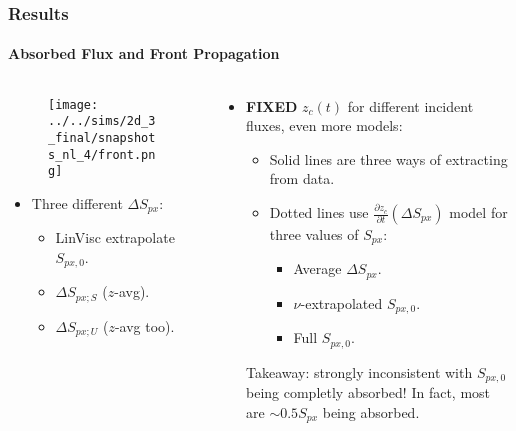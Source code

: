 \documentclass[dvipsnames]{beamer}
\newcommand*{\pd}[2]{\frac{\partial#1}{\partial#2}}
\begin{document}
\begin{frame}
    \frametitle{Results}
    \framesubtitle{Absorbed Flux and Front Propagation}

    \begin{columns}
        \begin{column}{0.5\textwidth}
            \begin{figure}[t]
                \centering
                \texttt{[image: ../../sims/2d\_3\_final/snapshots\_nl\_4/front.png]}
            \end{figure}
            \begin{itemize}
                \item Three different $\Delta S_{px}$:
                    \begin{itemize}
                        \item LinVisc extrapolate $S_{px, 0}$.

                        \item $\Delta S_{px; S}$ ($z$-avg).

                        \item $\Delta S_{px; U}$ ($z$-avg too).
                    \end{itemize}
            \end{itemize}
        \end{column}
        \begin{column}{0.5\textwidth}
            \begin{itemize}

                \item \textbf{FIXED} $z_c(t)$ for different incident fluxes,
                    even more models:
                    \begin{itemize}
                        \item Solid lines are three ways of extracting from
                            data.

                        \item Dotted lines use $\pd{z_c}{t}(\Delta S_{px})$
                            model for three values of $S_{px}$:
                            \begin{itemize}
                                \item Average $\Delta S_{px}$.
                                \item $\nu$-extrapolated $S_{px, 0}$.
                                \item Full $S_{px, 0}$.
                            \end{itemize}
                    \end{itemize}
                    Takeaway: strongly inconsistent with $S_{px, 0}$ being
                    completly absorbed! In fact, most are $\sim 0.5S_{px}$ being
                    absorbed.
            \end{itemize}
        \end{column}
    \end{columns}
\end{frame}
\end{document}
